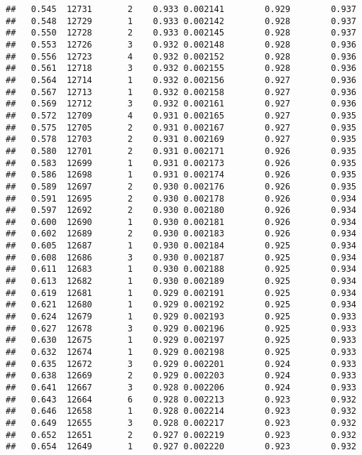 \documentclass[
]{book}
\begin{document}
\begin{verbatim}
##   0.545  12731       2    0.933 0.002141        0.929        0.937
##   0.548  12729       1    0.933 0.002142        0.928        0.937
##   0.550  12728       2    0.933 0.002145        0.928        0.937
##   0.553  12726       3    0.932 0.002148        0.928        0.936
##   0.556  12723       4    0.932 0.002152        0.928        0.936
##   0.561  12718       3    0.932 0.002155        0.928        0.936
##   0.564  12714       1    0.932 0.002156        0.927        0.936
##   0.567  12713       1    0.932 0.002158        0.927        0.936
##   0.569  12712       3    0.932 0.002161        0.927        0.936
##   0.572  12709       4    0.931 0.002165        0.927        0.935
##   0.575  12705       2    0.931 0.002167        0.927        0.935
##   0.578  12703       2    0.931 0.002169        0.927        0.935
##   0.580  12701       2    0.931 0.002171        0.926        0.935
##   0.583  12699       1    0.931 0.002173        0.926        0.935
##   0.586  12698       1    0.931 0.002174        0.926        0.935
##   0.589  12697       2    0.930 0.002176        0.926        0.935
##   0.591  12695       2    0.930 0.002178        0.926        0.934
##   0.597  12692       2    0.930 0.002180        0.926        0.934
##   0.600  12690       1    0.930 0.002181        0.926        0.934
##   0.602  12689       2    0.930 0.002183        0.926        0.934
##   0.605  12687       1    0.930 0.002184        0.925        0.934
##   0.608  12686       3    0.930 0.002187        0.925        0.934
##   0.611  12683       1    0.930 0.002188        0.925        0.934
##   0.613  12682       1    0.930 0.002189        0.925        0.934
##   0.619  12681       1    0.929 0.002191        0.925        0.934
##   0.621  12680       1    0.929 0.002192        0.925        0.934
##   0.624  12679       1    0.929 0.002193        0.925        0.933
##   0.627  12678       3    0.929 0.002196        0.925        0.933
##   0.630  12675       1    0.929 0.002197        0.925        0.933
##   0.632  12674       1    0.929 0.002198        0.925        0.933
##   0.635  12672       3    0.929 0.002201        0.924        0.933
##   0.638  12669       2    0.929 0.002203        0.924        0.933
##   0.641  12667       3    0.928 0.002206        0.924        0.933
##   0.643  12664       6    0.928 0.002213        0.923        0.932
##   0.646  12658       1    0.928 0.002214        0.923        0.932
##   0.649  12655       3    0.928 0.002217        0.923        0.932
##   0.652  12651       2    0.927 0.002219        0.923        0.932
##   0.654  12649       1    0.927 0.002220        0.923        0.932

\end{verbatim}
\end{document}
